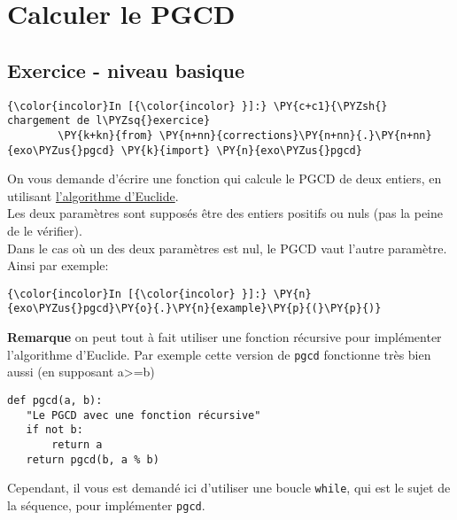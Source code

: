     \hypertarget{calculer-le-pgcd}{%
\section{Calculer le PGCD}\label{calculer-le-pgcd}}

    \hypertarget{exercice---niveau-basique}{%
\subsection{Exercice - niveau basique}\label{exercice---niveau-basique}}

    \begin{Verbatim}[commandchars=\\\{\}]
{\color{incolor}In [{\color{incolor} }]:} \PY{c+c1}{\PYZsh{} chargement de l\PYZsq{}exercice}
        \PY{k+kn}{from} \PY{n+nn}{corrections}\PY{n+nn}{.}\PY{n+nn}{exo\PYZus{}pgcd} \PY{k}{import} \PY{n}{exo\PYZus{}pgcd}
\end{Verbatim}


    On vous demande d'écrire une fonction qui calcule le PGCD de deux
entiers, en utilisant
\href{http://fr.wikipedia.org/wiki/Algorithme_d'Euclide}{l'algorithme
d'Euclide}.\\

    Les deux paramètres sont supposés être des entiers positifs ou nuls (pas
la peine de le vérifier).\\

Dans le cas où un des deux paramètres est nul, le PGCD vaut l'autre
paramètre. Ainsi par exemple:

    \begin{Verbatim}[commandchars=\\\{\}]
{\color{incolor}In [{\color{incolor} }]:} \PY{n}{exo\PYZus{}pgcd}\PY{o}{.}\PY{n}{example}\PY{p}{(}\PY{p}{)}
\end{Verbatim}


    \textbf{Remarque} on peut tout à fait utiliser une fonction récursive
pour implémenter l'algorithme d'Euclide. Par exemple cette version de
\texttt{pgcd} fonctionne très bien aussi (en supposant
a\textgreater{}=b)

\begin{verbatim}
def pgcd(a, b):
   "Le PGCD avec une fonction récursive"
   if not b:
       return a
   return pgcd(b, a % b)
\end{verbatim}

Cependant, il vous est demandé ici d'utiliser une boucle \texttt{while},
qui est le sujet de la séquence, pour implémenter \texttt{pgcd}.

